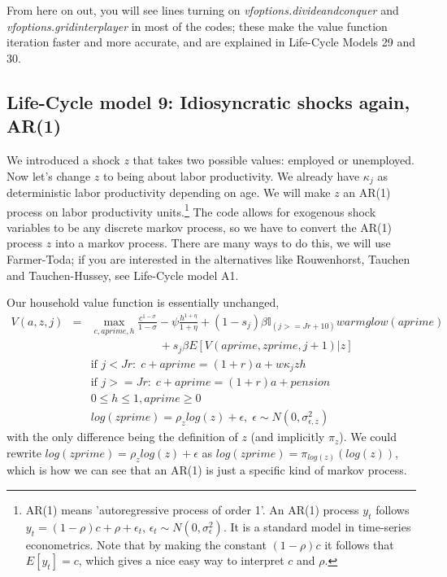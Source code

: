 From here on out, you will see lines turning on \textit{vfoptions.divideandconquer} and \textit{vfoptions.gridinterplayer} in most of the codes; these make the value function iteration faster and more accurate, and are explained in Life-Cycle Models 29 and 30.

\subsection{Life-Cycle model 9: Idiosyncratic shocks again, AR(1)}
We introduced a shock $z$ that takes two possible values: employed or unemployed. Now let's change $z$ to being about labor productivity. We already have $\kappa_j$ as deterministic labor productivity depending on age. We will make $z$ an AR(1) process on labor productivity units.\footnote{AR(1) means 'autoregressive process of order 1'. An AR(1) process $y_t$ follows $y_t=(1-\rho)c+\rho+\epsilon_t$, $\epsilon_t \sim N(0,\sigma_{\epsilon}^2)$. It is a standard model in time-series econometrics. Note that by making the constant $(1-\rho)c$ it follows that $E[y_t]=c$, which gives a nice easy way to interpret $c$ and $\rho$.} The code allows for exogenous shock variables to be any discrete markov process, so we have to convert the AR(1) process $z$ into a markov process. There are many ways to do this, we will use Farmer-Toda; if you are interested in the alternatives like Rouwenhorst, Tauchen and Tauchen-Hussey, see Life-Cycle model A1.

Our household value function is essentially unchanged,
\begin{eqnarray*}
 V(a,z,j)&=& \max_{c,aprime,h} \frac{c^{1-\sigma}}{1-\sigma} - \psi \frac{h^{1+\eta}}{1+\eta} + (1-s_j)\beta  \mathbb{I}_{(j>=Jr+10)} warmglow(aprime)    \\
 && \quad \quad \quad \quad \quad \quad  + s_j \beta E[V(aprime,zprime,j+1)|z] \\
&& \text{if }j<Jr: \; c+aprime=(1+r)a+w \kappa_j z h\\
&& \text{if }j>=Jr: \; c+aprime=(1+r)a +pension\\
&& 0\leq h \leq 1, aprime\geq 0 \\
&& log(zprime)=\rho_z log(z) + \epsilon, \; \epsilon \sim N(0,\sigma_{\epsilon,z}^2)
\end{eqnarray*}
with the only difference being the definition of $z$ (and implicitly $\pi_z$). We could rewrite $log(zprime)=\rho_z log(z) + \epsilon$ as $log(zprime)=\pi_{log(z)}(log(z))$, which is how we can see that an AR(1) is just a specific kind of markov process.


